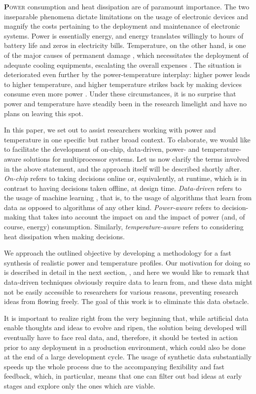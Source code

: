 \lettrine[findent=0.4em, nindent=0em]{\textbf{P}}{ower} consumption and heat
dissipation are of paramount importance. The two inseparable phenomena dictate
limitations on the usage of electronic devices and magnify the costs pertaining
to the deployment and maintenance of electronic systems. Power is essentially
energy, and energy translates willingly to hours of battery life and zeros in
electricity bills. Temperature, on the other hand, is one of the major causes of
permanent damage \cite{jedec}, which necessitates the deployment of adequate
cooling equipments, escalating the overall expenses \cite{chaudhry2015}. The
situation is deteriorated even further by the power-temperature interplay:
higher power leads to higher temperature, and higher temperature strikes back by
making devices consume even more power \cite{liu2007}. Under these
circumstances, it is no surprise that power and temperature have steadily been
in the research limelight and have no plans on leaving this spot.

In this paper, we set out to assist researchers working with power and
temperature in one specific but rather broad context. To elaborate, we would
like to facilitate the development of on-chip, data-driven, power- and
temperature-aware solutions for multiprocessor systems. Let us now clarify the
terms involved in the above statement, and the approach itself will be described
shortly after. \emph{On-chip} refers to taking decisions online or,
equivalently, at runtime, which is in contrast to having decisions taken
offline, at design time. \emph{Data-driven} refers to the usage of machine
learning \cite{bishop2006}, that is, to the usage of algorithms that learn from
data as opposed to algorithms of any other kind. \emph{Power-aware} refers to
decision-making that takes into account the impact on and the impact of power
(and, of course, energy) consumption. Similarly, \emph{temperature-aware} refers
to considering heat dissipation when making decisions.

We approach the outlined objective by developing a methodology for a fast
synthesis of realistic power and temperature profiles. Our motivation for doing
so is described in detail in the next section, , and here we
would like to remark that data-driven techniques obviously require data to learn
from, and these data might not be easily accessible to researchers for various
reasons, preventing research ideas from flowing freely. The goal of this work is
to eliminate this data obstacle.

It is important to realize right from the very beginning that, while artificial
data enable thoughts and ideas to evolve and ripen, the solution being developed
will eventually have to face real data, and, therefore, it should be tested in
action prior to any deployment in a production environment, which could also be
done at the end of a large development cycle. The usage of synthetic data
substantially speeds up the whole process due to the accompanying flexibility
and fast feedback, which, in particular, means that one can filter out bad ideas
at early stages and explore only the ones which are viable.

